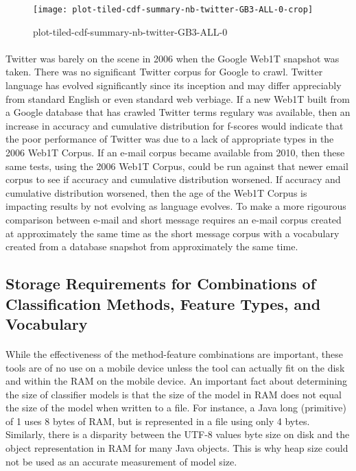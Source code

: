 	\begin{figure}[htbp!]
		\begin{center}
		\centering
		\texttt{[image: plot-tiled-cdf-summary-nb-twitter-GB3-ALL-0-crop]}
		\caption{plot-tiled-cdf-summary-nb-twitter-GB3-ALL-0}
		\label{fig:plot-tiled-cdf-summary-nb-twitter-GB3-ALL-0}
		\end{center}
	\end{figure}
	
		\paragraph*{} Twitter was barely on the scene in 2006 when the Google Web1T snapshot was taken.  There was no significant Twitter corpus for Google to crawl.  Twitter language has evolved significantly since its inception and may differ appreciably from standard English or even standard web verbiage.  If a new Web1T built from a Google database that has crawled Twitter terms regulary was available, then an increase in accuracy and cumulative distribution for f-scores would indicate that the poor performance of Twitter was due to a lack of appropriate types in the 2006 Web1T Corpus.  If an e-mail corpus became available from 2010, then these same tests, using the 2006 Web1T Corpus, could be run against that newer email corpus to see if accuracy and cumulative distribution worsened.  If accuracy and cumulative distribution worsened, then the age of the Web1T Corpus is impacting results by not evolving as language evolves.  To make a more rigourous comparison between e-mail and short message requires an e-mail corpus created at approximately the same time as the short message corpus with a vocabulary created from a database snapshot from approximately the same time.

\begin{singlespace}
\section{Storage Requirements for Combinations of Classification Methods, Feature Types, and Vocabulary}
\end{singlespace}
	\paragraph*{} While the effectiveness of the method-feature combinations are important, these tools are of no use on a mobile device unless the tool can actually fit on the disk and within the RAM on the mobile device.  An important fact about determining the size of classifier models is that the size of the model in RAM does not equal the size of the model when written to a file.  For instance, a Java long (primitive) of 1 uses 8 bytes of RAM, but is represented in a file using only 4 bytes.  Similarly, there is a disparity between the UTF-8 values byte size on disk and the object representation in RAM for many Java objects.  This is why heap size could not be used as an accurate measurement of model size.
